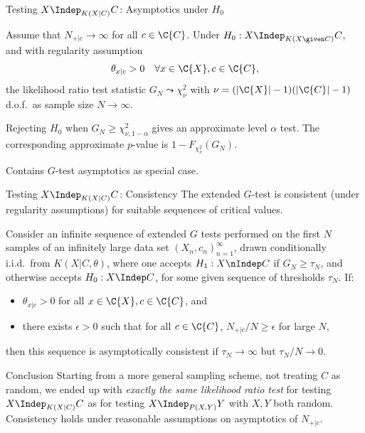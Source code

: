 \begin{frame}{Testing $X \Indep_{K(X|C)} C$: Asymptotics under $H_0$}
\begin{Prp}
Assume that $N_{+|c} \to \infty$ for all $c \in \C{C}$.
Under $H_0 : X \Indep_{K(X \given C)} C$, and with regularity assumption
$$\theta_{x|c} > 0 \quad\forall x \in \C{X}, c \in \C{C},$$
the likelihood ratio test statistic $G_N \leadsto \chi_\nu^2$ 
with $\nu = (|\C{X}| - 1)(|\C{C}| - 1)$ d.o.f.\ as sample size $N \to \infty$.
\end{Prp}
\begin{Cor}
  Rejecting $H_0$ when $G_N \ge \chi_{\nu,1-\alpha}^2$ gives an approximate level $\alpha$ test.
  The corresponding approximate $p$-value is $1-F_{\chi^2_\nu}(G_N)$.
\end{Cor}
Contains $G$-test asymptotics as special case. 

\end{frame}

\begin{frame}{Testing $X \Indep_{K(X|C)} C$: Consistency}
  The extended $G$-test is consistent (under regularity assumptions) for suitable sequences of critical values.
  \begin{Cor}
  Consider an infinite sequence of extended $G$ tests performed on the first $N$ samples of an infinitely large
  data set $(X_n,c_n)_{n=1}^\infty$, drawn conditionally i.i.d.\ from $K(X|C,\theta)$,
  where one accepts $H_1 : X \nIndep C$ if $G_N \ge \tau_N$, and otherwise accepts $H_0 : X \Indep C$,
  for some given sequence of thresholds $\tau_N$.
  If:
    \begin{itemize}
      \item $\theta_{x|c} > 0$ for all $x \in \C{X}, c \in \C{C}$, and
      \item there exists $\epsilon > 0$ such that for all $c \in \C{C}$, $N_{+|c} / N \ge \epsilon$ for large $N$,
    \end{itemize}
  then this sequence is asymptotically consistent if $\tau_N \to \infty$ but $\tau_N / N \to 0$.
  \end{Cor}
\begin{block}{Conclusion}
  Starting from a more general sampling scheme, not treating $C$ as random, we ended up with \emph{exactly the same likelihood ratio test} for testing $X \Indep_{K(X|C)} C$ as for testing $X \Indep_{P(X,Y)} Y$ with $X,Y$ both random. 
  Consistency holds under reasonable assumptions on asymptotics of $N_{+|c}$.
\end{block}
\end{frame}

